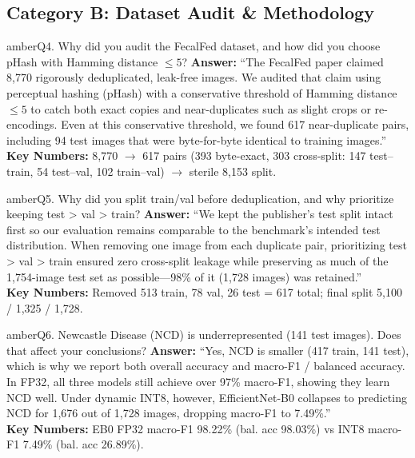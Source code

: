\documentclass[10pt,a4paper]{article}
\begin{document}
\subsection*{\textcolor{amber}{Category B: Dataset Audit \& Methodology}}

\begin{qabox}{amber}{Q4. Why did you audit the FecalFed dataset, and how did you choose pHash with Hamming distance $\le 5$?}
\textbf{Answer:}
``The FecalFed paper claimed 8,770 rigorously deduplicated, leak-free images. We audited that claim using perceptual hashing (pHash) with a conservative threshold of Hamming distance $\le 5$ to catch both exact copies and near-duplicates such as slight crops or re-encodings. Even at this conservative threshold, we found 617 near-duplicate pairs, including 94 test images that were byte-for-byte identical to training images.''\\[3pt]
\textbf{Key Numbers:} 8,770 $\to$ 617 pairs (393 byte-exact, 303 cross-split: 147 test--train, 54 test--val, 102 train--val) $\to$ sterile 8,153 split.
\end{qabox}

\begin{qabox}{amber}{Q5. Why did you split train/val before deduplication, and why prioritize keeping test > val > train?}
\textbf{Answer:}
``We kept the publisher's test split intact first so our evaluation remains comparable to the benchmark's intended test distribution. When removing one image from each duplicate pair, prioritizing test > val > train ensured zero cross-split leakage while preserving as much of the 1,754-image test set as possible---98\% of it (1,728 images) was retained.''\\[3pt]
\textbf{Key Numbers:} Removed 513 train, 78 val, 26 test = 617 total; final split 5,100 / 1,325 / 1,728.
\end{qabox}

\begin{qabox}{amber}{Q6. Newcastle Disease (NCD) is underrepresented (141 test images). Does that affect your conclusions?}
\textbf{Answer:}
``Yes, NCD is smaller (417 train, 141 test), which is why we report both overall accuracy and macro-F1 / balanced accuracy. In FP32, all three models still achieve over 97\% macro-F1, showing they learn NCD well. Under dynamic INT8, however, EfficientNet-B0 collapses to predicting NCD for 1,676 out of 1,728 images, dropping macro-F1 to 7.49\%.''\\[3pt]
\textbf{Key Numbers:} EB0 FP32 macro-F1 98.22\% (bal. acc 98.03\%) vs INT8 macro-F1 7.49\% (bal. acc 26.89\%).
\end{qabox}
\end{document}
